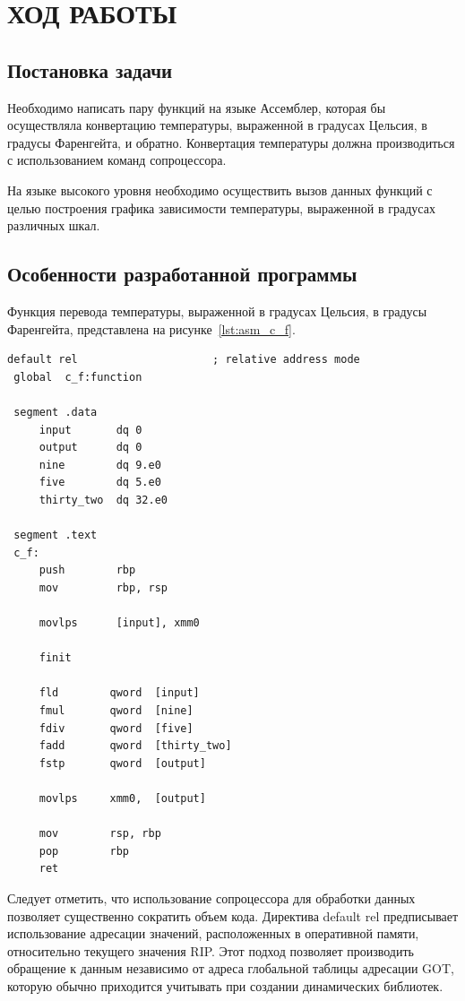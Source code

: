 \section{ХОД РАБОТЫ}

\subsection{Постановка задачи}

Необходимо написать пару функций на языке Ассемблер,
которая бы осуществляла конвертацию температуры, выраженной в градусах 
Цельсия, в градусы Фаренгейта, и обратно.
Конвертация температуры должна производиться с использованием команд сопроцессора.

На языке высокого уровня необходимо осуществить вызов данных функций с
целью построения графика зависимости температуры, выраженной в градусах
различных шкал.

\subsection{Особенности разработанной программы}

Функция перевода температуры, выраженной в градусах Цельсия, в градусы Фаренгейта,
представлена на рисунке~\ref{lst:asm_c_f}.

\begin{lstlisting}[caption=Функция перевода температуры,
label=lst:asm_c_f,language={[x86masm]Assembler},basicstyle=\scriptsize\ttfamily]
 default rel                     ; relative address mode
 global  c_f:function
     
 segment .data
     input       dq 0
     output      dq 0
     nine        dq 9.e0
     five        dq 5.e0
     thirty_two  dq 32.e0
 
 segment .text
 c_f:
     push        rbp
     mov         rbp, rsp
 
     movlps      [input], xmm0
     
     finit
 
     fld        qword  [input]
     fmul       qword  [nine]
     fdiv       qword  [five]
     fadd       qword  [thirty_two]
     fstp       qword  [output]
                        
     movlps     xmm0,  [output]
     
     mov        rsp, rbp
     pop        rbp
     ret
\end{lstlisting}

Следует отметить, что использование сопроцессора для обработки данных 
позволяет существенно сократить объем кода. Директива default rel предписывает
использование адресации значений, расположенных в оперативной памяти,
относительно текущего значения RIP. Этот подход позволяет производить обращение
к данным независимо от адреса глобальной таблицы адресации GOT, которую
обычно приходится учитывать при создании динамических библиотек.

